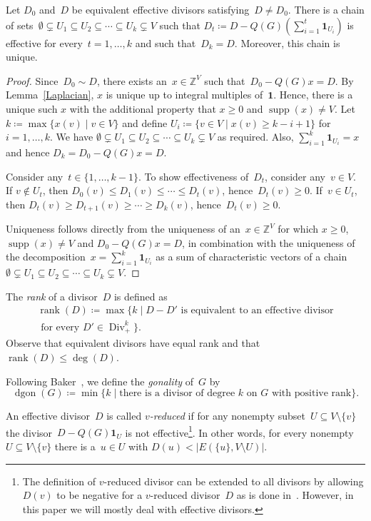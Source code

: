 \documentclass[ALCO,ThmDefs,Unicode,epreuves]{cedram}
\newcommand{\Z}{\ensuremath{\mathbb{Z}}}
\newcommand{\one}{\ensuremath{\mathbf{1}}}
\DeclareMathOperator{\Div}{Div}
\DeclareMathOperator{\dgon}{dgon}
\DeclareMathOperator{\supp}{supp}
\DeclareMathOperator{\rank}{rank}
\begin{document}
\begin{lemma}\label{chain}
Let $D_0$ and~$D$ be equivalent effective divisors satisfying~$D \neq D_0$. There is a chain of sets~$\emptyset\subsetneq U_1\subseteq U_2\subseteq \cdots\subseteq U_k\subsetneq V$ such that $D_t\coloneqq D-Q(G)(\sum_{i=1}^t \one_{U_i})$ is effective for every~$t=1,\ldots,k$ and such that~$D_k=D$. Moreover, this chain is unique.
\end{lemma}
\begin{proof}
Since~$D_0\sim D$, there exists an~$x\in \Z^V$ such that~$D_0-Q(G)x=D$. By Lemma~\ref{Laplacian}, $x$ is unique up to integral multiples of~$\one$. Hence, there is a unique such $x$ with the additional property that $x\geq 0$ and $\supp(x)\neq V$. Let $k\coloneqq \max\{x(v)\mid v\in V\}$ and define $U_i\coloneqq \{v\in V\mid x(v)\geq k-i+1\}$ for $i=1,\ldots, k$. We have $\emptyset\subsetneq U_1\subseteq U_2\subseteq \cdots\subseteq U_k\subsetneq V$ as required. Also, $\sum_{i=1}^k \one_{U_i}=x$ and hence $D_k=D_0-Q(G)x=D$.

Consider any~$t\in \{1,\ldots, k-1\}$. To show effectiveness of~$D_t$, consider any~$v\in V$. If $v\not\in U_t$, then $D_0(v)\leq D_1(v)\leq \cdots\leq D_t(v)$, hence~$D_t(v)\geq 0$. If~$v\in U_t$, then $D_t(v)\geq D_{t+1}(v)\geq \cdots \geq D_k(v)$, hence~$D_t(v)\geq 0$. 

Uniqueness follows directly from the uniqueness of an~$x\in \Z^V$ for which $x\geq 0$, $\supp(x)\neq V$ and $D_0-Q(G)x=D$, in combination with the uniqueness of the decomposition~$x=\sum_{i=1}^k\one_{U_i}$ as a sum of characteristic vectors of a chain~$\emptyset\subsetneq U_1\subseteq U_2\subseteq \cdots\subseteq U_k\subsetneq V$.
\end{proof}

The \emph{rank} of a divisor~$D$ is defined as
\begin{multline}
\rank(D)\coloneqq \max\{k\mid \text{$D-D'$ is equivalent to an effective divisor}\\\text{ for every~$D'\in\Div_+^k$}\}.
\end{multline}
Observe that equivalent divisors have equal rank and that $\rank(D)\leq \deg(D)$.

Following Baker~\cite{Baker2008}, we define the \emph{gonality} of~$G$ by
\begin{equation}
\dgon(G)\coloneqq \min\{k\mid \text{there is a divisor of degree~$k$ on~$G$ with positive rank}\}.
\end{equation} 


An effective divisor~$D$ is called \emph{$v$-reduced} if for any nonempty subset~$U\subseteq V\setminus \{v\}$ the divisor~$D-Q(G)\one_U$ is not effective\footnote{The definition of $v$-reduced divisor can be extended to all divisors by allowing $D(v)$ to be negative for a $v$-reduced divisor~$D$ as is done in~\cite{BakerNorine2007}. However, in this paper we will mostly deal with effective divisors.}. In other words, for every nonempty~$U\subseteq V\setminus \{v\}$ there is a~$u\in U$ with $D(u)<|E(\{u\}, V\setminus U)|$. 
\end{document}
